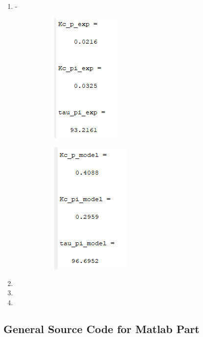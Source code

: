 \documentclass[a4paper,12pt]{article}
\begin{document}
\begin{enumerate}
			
		\newpage
		\item - 
		
			
			
\begin{figure}[H]
	\setlength{\unitlength}{\textwidth} 
	\centering
	\begin{subfigure}{.5\textwidth}
  		\centering
  		\includegraphics[width=0.48\unitlength]{images/cont_par_exp}
	\end{subfigure}%
	\begin{subfigure}{.5\textwidth}
  		\centering
		\includegraphics[width=0.48\unitlength]{images/cont_par_model}
	\end{subfigure}
\end{figure}
	
			
			
			
			
		\item 
		
		\item 
		
		\item
		
		 
					
			
			
			
			
	\end{enumerate}
		
					

		
		

	\newpage
\begin{appendices}
\section{General Source Code for Matlab Part}\label{appendix}
 
\end{appendices}
\end{document}
